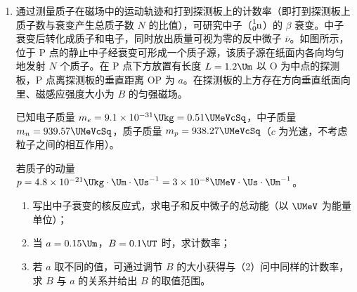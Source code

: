 \documentclass[\gkver]{gaokaozhenti}
\begin{document}
\begin{enumerate}
{（3）由题意知，导体棒做简谐运动，则有 $F_{\text{回复}}=F_{A}+F=-kx$①。由题给条件知 $F_{0}=-kx_{0}$，解得 $k=1$。当 $F_{A}=-F$ 时，代入①可知 $x=0$，此时导体棒处于平衡位置，导体棒的速度取最大值，即 $v=\pm v_{m}=\pm1\Ums$；当 $F_{A}=F$ 时，设此时导体棒的位移为 $x'$、速度为 $v'$，代入①有 $F_{A}=-\frac{1}{2}kx'=-\frac{1}{2}x'$，又 $F_{A}=-BIl=-\frac{B^{2}l^{2}v}{R}=-\frac{1}{4}v$，联立化简得 $2x'=v'$②。设导体棒从 $x_{0}$ 运动至 $x'$ 时，回复力对导体棒做的功为 $W$，$F_{\text{回复}}$ 与 $x$ 成线性关系，由提示知 $F-x$ 图象下的“面积”代表 $F$ 所做的功（也可理解成平均力做功），则 $W=\frac{kx_{0}+kx'}{2}(x_{0}-x')=\frac{1}{2}k(x_{0}^{2}-x'^{2})$；导体棒从 $x_{0}$ 运动至 $x'$ 时，由动能定理得 $\frac{1}{2}mv'^{2}=\frac{1}{2}k(x_{0}^{2}-x'^{2})$③，联立②③解得 $x_{1}'=\frac{1}{\sqrt 5}\Um$ 或 $x_{2}'=-\frac{1}{\sqrt 5}\Um$，当 $x_{1}'=\frac{1}{\sqrt 5}\Um$ 时，$v_{1}'=\frac{2}{\sqrt 5}\Ums$；当 $x_{2}'=-\frac{1}{\sqrt 5}\Um$ 时，$v_{2}'=-\frac{2}{\sqrt 5}\Ums$。
}

\item
通过测量质子在磁场中的运动轨迹和打到探测板上的计数率（即打到探测板上质子数与衰变产生总质子数 $N$ 的比值），可研究中子（$\ce{^{1}_{0}n}$）的 $\beta$ 衰变。中子衰变后转化成质子和电子，同时放出质量可视为零的反中微子 $\overline{\nu}$。如图所示，位于 P 点的静止中子经衰变可形成一个质子源，该质子源在纸面内各向均匀地发射 $N$ 个质子。在 P 点下方放置有长度 $L=1.2\Um$ 以 O 为中点的探测板，P 点离探测板的垂直距离 OP 为 $a$。在探测板的上方存在方向垂直纸面向里、磁感应强度大小为 $B$ 的匀强磁场。

已知电子质量 $m_{e}=9.1\times10^{-31}\Ukg=0.51\UMeVcSq$，中子质量 $m_{n}=939.57\UMeVcSq$，质子质量 $m_{p}=938.27\UMeVcSq$（$c$ 为光速，不考虑粒子之间的相互作用）。

若质子的动量 $p=4.8\times10^{-21}\Ukg\cdot\Um\cdot\Us^{-1}=3\times10^{-8}\UMeV\cdot\Us\cdot\Um^{-1}$。
\begin{enumerate}
	\item
	写出中子衰变的核反应式，求电子和反中微子的总动能（以 $\UMeV$ 为能量单位）；
	\item
	当 $a=0.15\Um$，$B=0.1\UT$ 时，求计数率；
	\item
	若 $a$ 取不同的值，可通过调节 $B$ 的大小获得与（2）问中同样的计数率，求 $B$ 与 $a$ 的关系并给出 $B$ 的取值范围。
\end{enumerate}
\end{enumerate}
\end{document}
